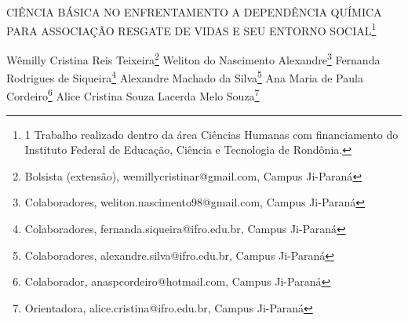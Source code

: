 \documentclass[article,12pt,onesidea,4paper,english,brazil]{abntex2}
\begin{document}
	
	
	\frenchspacing 
	
	\begin{center}
		\LARGE CIÊNCIA BÁSICA NO ENFRENTAMENTO A DEPENDÊNCIA QUÍMICA PARA ASSOCIAÇÃO RESGATE DE VIDAS E SEU ENTORNO SOCIAL\footnote{1	Trabalho realizado dentro da área Ciências Humanas com financiamento do Instituto Federal de Educação, Ciência e Tecnologia de Rondônia.}
		
		\normalsize
		Wêmilly Cristina Reis Teixeira\footnote{Bolsista (extensão), wemillycristinar@gmail.com, Campus Ji-Paraná} 
		Weliton do Nascimento Alexandre\footnote{Colaboradores, weliton.nascimento98@gmail.com,  Campus Ji-Paraná} 
		Fernanda Rodrigues de Siqueira\footnote{Colaboradores, fernanda.siqueira@ifro.edu.br, Campus Ji-Paraná} 
		Alexandre Machado da Silva\footnote{Colaboradores, alexandre.silva@ifro.edu.br,  Campus Ji-Paraná}
		Ana Maria de Paula Cordeiro\footnote{Colaborador, anaspcordeiro@hotmail.com, Campus Ji-Paraná}
		Alice Cristina Souza Lacerda Melo Souza\footnote{Orientadora, alice.cristina@ifro.edu.br, Campus Ji-Paraná} 
	\end{center}
	
\end{document}
